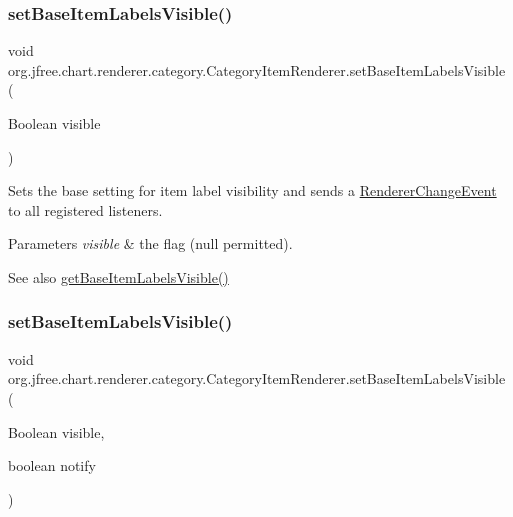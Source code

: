 \subsubsection{\texorpdfstring{set\+Base\+Item\+Labels\+Visible()}{setBaseItemLabelsVisible()}\hspace{0.1cm}{\footnotesize\ttfamily [2/3]}}
{\footnotesize\ttfamily void org.\+jfree.\+chart.\+renderer.\+category.\+Category\+Item\+Renderer.\+set\+Base\+Item\+Labels\+Visible (\begin{DoxyParamCaption}\item[{Boolean}]{visible }\end{DoxyParamCaption})}

Sets the base setting for item label visibility and sends a \mbox{\hyperlink{}{Renderer\+Change\+Event}} to all registered listeners.


\begin{DoxyParams}{Parameters}
{\em visible} & the flag ({\ttfamily null} permitted).\\
\hline
\end{DoxyParams}
\begin{DoxySeeAlso}{See also}
\mbox{\hyperlink{interfaceorg_1_1jfree_1_1chart_1_1renderer_1_1category_1_1_category_item_renderer_a2d90e661b0f4c361b2f378293310a3e6}{get\+Base\+Item\+Labels\+Visible()}} 
\end{DoxySeeAlso}
\mbox{\label{interfaceorg_1_1jfree_1_1chart_1_1renderer_1_1category_1_1_category_item_renderer_ab28c1624b9b8c424bb17737b6d261d29}} 
\subsubsection{\texorpdfstring{set\+Base\+Item\+Labels\+Visible()}{setBaseItemLabelsVisible()}\hspace{0.1cm}{\footnotesize\ttfamily [3/3]}}
{\footnotesize\ttfamily void org.\+jfree.\+chart.\+renderer.\+category.\+Category\+Item\+Renderer.\+set\+Base\+Item\+Labels\+Visible (\begin{DoxyParamCaption}\item[{Boolean}]{visible,  }\item[{boolean}]{notify }\end{DoxyParamCaption})}


